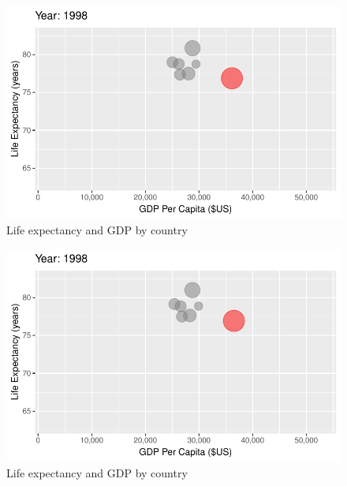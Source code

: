 \documentclass[
  letterpaper,
  DIV=11,
  numbers=noendperiod]{scrreport}
\theoremstyle{definition}
\theoremstyle{remark}
\begin{document}
\begin{figure}

{\centering \includegraphics{index_files/figure-pdf/fig-anim-country-83.pdf}

}

\caption{\label{fig-anim-country-83}Life expectancy and GDP by country}

\end{figure}

\begin{figure}

{\centering \includegraphics{index_files/figure-pdf/fig-anim-country-84.pdf}

}

\caption{\label{fig-anim-country-84}Life expectancy and GDP by country}

\end{figure}
\end{document}
